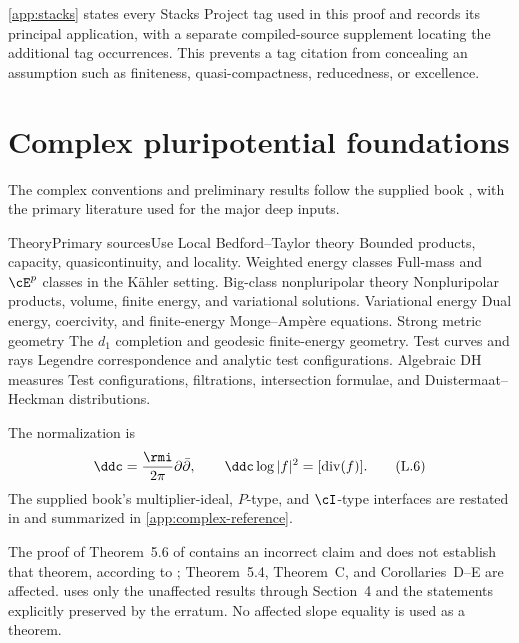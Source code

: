 \cref{app:stacks} states every Stacks Project tag used in this proof and
records its principal application, with a separate compiled-source
supplement locating the additional tag occurrences.  This prevents a tag citation from concealing
an assumption such as finiteness, quasi-compactness, reducedness, or
excellence.

\section{Complex pluripotential foundations}
\label{sec:appL-complex}

The complex conventions and preliminary results follow the supplied book
\cite{XiaBook}, with the primary literature used for the major deep inputs.

\begin{AppLProvenanceLedger}{Theory}{Primary sources}{Use}
\AppLProvenanceRecord
  {Local Bedford--Taylor theory}
  {\cite{BT76,BT82}}
  {Bounded products, capacity, quasicontinuity, and locality.}
\AppLProvenanceRecord
  {Weighted energy classes}
  {\cite{GZ07}}
  {Full-mass and \(\cE^p\) classes in the Kähler setting.}
\AppLProvenanceRecord
  {Big-class nonpluripolar theory}
  {\cite{BEGZ10}}
  {Nonpluripolar products, volume, finite energy, and variational
   solutions.}
\AppLProvenanceRecord
  {Variational energy}
  {\cite{BBGZ13}}
  {Dual energy, coercivity, and finite-energy Monge--Ampère equations.}
\AppLProvenanceRecord
  {Strong metric geometry}
  {\cite{Dar15}}
  {The \(d_1\) completion and geodesic finite-energy geometry.}
\AppLProvenanceRecord
  {Test curves and rays}
  {\cite{RWN14}}
  {Legendre correspondence and analytic test configurations.}
\AppLProvenanceRecord
  {Algebraic DH measures}
  {\cite{BHJ17}}
  {Test configurations, filtrations, intersection formulae, and
   Duistermaat--Heckman distributions.}
\end{AppLProvenanceLedger}

The normalization is
\[
 \ddc=\frac{\rmi}{2\pi}\partial\bar\partial,
 \qquad
 \ddc\log|f|^2=[\operatorname{div}(f)].
\tag{L.6}\label{eq:appL-complex-normalization}
\]
The supplied book's multiplier-ideal, \(P\)-type, and \(\cI\)-type
interfaces are restated in
 and
summarized in
\cref{app:complex-reference}.

\begin{remark}
\label{rem:appL-bhj-erratum}
The proof of Theorem~5.6 of \cite{BHJ19} contains an incorrect claim and
does not establish that theorem, according to \cite{BHJ19err};
Theorem~5.4, Theorem~C, and Corollaries~D--E are affected.
 uses only the unaffected results through
Section~4 and the
statements explicitly preserved by the erratum.  No affected slope equality
is used as a theorem.
\end{remark}

